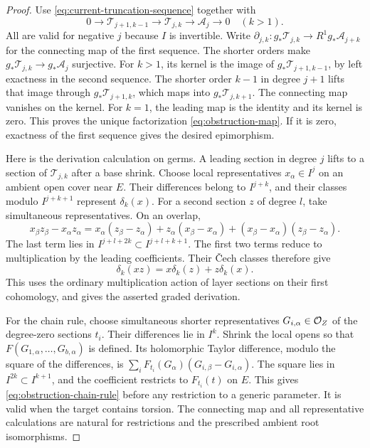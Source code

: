 \begin{proof}
Use \eqref{eq:current-truncation-sequence} together with
\begin{equation}
 0\longrightarrow\mathcal T_{j+1,k-1}\longrightarrow\mathcal T_{j,k}
 \longrightarrow\mathcal A_j\longrightarrow0\quad(k>1).
 \label{eq:leading-truncation-sequence}
\end{equation}
All are valid for negative \(j\) because \(I\) is invertible.  Write
\(\partial_{j,k}:g_*\mathcal T_{j,k}\to R^1g_*\mathcal A_{j+k}\) for
the connecting map of the first sequence.  The shorter orders make
\(g_*\mathcal T_{j,k}\to g_*\mathcal A_j\) surjective.  For \(k>1\),
its kernel is the image of \(g_*\mathcal T_{j+1,k-1}\), by left exactness
in the second sequence.  The shorter order \(k-1\) in degree \(j+1\)
lifts that image through \(g_*\mathcal T_{j+1,k}\), which maps into
\(g_*\mathcal T_{j,k+1}\).  The connecting map vanishes on the kernel.
For \(k=1\), the leading map is the identity and its kernel is zero.
This proves the unique factorization \eqref{eq:obstruction-map}.
If it is zero, exactness of the first sequence gives the desired
epimorphism.

Here is the derivation calculation on germs.  A leading section in
degree \(j\) lifts to a section of \(\mathcal T_{j,k}\) after a base
shrink.  Choose local representatives \(x_\alpha\in I^j\) on an ambient
open cover near \(E\).  Their differences belong to \(I^{j+k}\), and
their classes modulo \(I^{j+k+1}\) represent \(\delta_k(x)\).  For a
second section \(z\) of degree \(l\), take simultaneous representatives.
On an overlap,
\[
 x_\beta z_\beta-x_\alpha z_\alpha
 =x_\alpha(z_\beta-z_\alpha)+z_\alpha(x_\beta-x_\alpha)
 +(x_\beta-x_\alpha)(z_\beta-z_\alpha).
\]
The last term lies in \(I^{j+l+2k}\subset I^{j+l+k+1}\).  The first two
terms reduce to multiplication by the leading coefficients.  Their
\v Cech classes therefore give
\[
 \delta_k(xz)=x\delta_k(z)+z\delta_k(x).
\]
This uses the ordinary multiplication action of layer sections on their
first cohomology, and gives the asserted graded derivation.

For the chain rule, choose simultaneous shorter representatives
\(G_{i,\alpha}\in\mathcal O_Z\) of the degree-zero sections \(t_i\).  Their
differences lie in \(I^k\).  Shrink the local opens so that
\(F(G_{1,\alpha},\ldots,G_{b,\alpha})\) is defined.  Its holomorphic
Taylor difference, modulo the square of the differences, is
\(\sum_iF_{t_i}(G_\alpha)(G_{i,\beta}-G_{i,\alpha})\).
The square lies in \(I^{2k}\subset I^{k+1}\), and the coefficient
restricts to \(F_{t_i}(t)\) on \(E\).  This gives
\eqref{eq:obstruction-chain-rule} before any restriction to a generic
parameter.  It is valid when the target contains torsion.  The connecting
map and all representative calculations are natural for restrictions
and the prescribed ambient root isomorphisms.
\end{proof}


